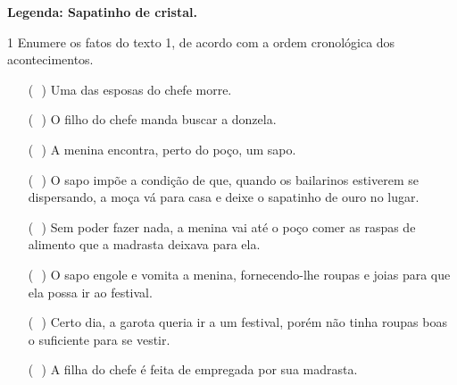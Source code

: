 \textbf{Legenda: Sapatinho de cristal.}


\num{1} Enumere os fatos do texto 1, de acordo com a ordem cronológica
dos acontecimentos.

\begin{itemize}
\item[(\,\,\,\,)] Uma das esposas do chefe morre.
\item[(\,\,\,\,)] O filho do chefe manda buscar a donzela.
\item[(\,\,\,\,)] A menina encontra, perto do poço, um sapo.
\item[(\,\,\,\,)] O sapo impõe a condição de que, quando os bailarinos estiverem se
dispersando, a moça vá para casa e deixe o sapatinho de ouro no lugar.
\item[(\,\,\,\,)] Sem poder fazer nada, a menina vai até o poço comer as raspas de
alimento que a madrasta deixava para ela.
\item[(\,\,\,\,)] O sapo engole e vomita a menina, fornecendo-lhe roupas e joias para
que ela possa ir ao festival.
\item[(\,\,\,\,)] Certo dia, a garota queria ir a um festival, porém não tinha roupas
boas o suficiente para se vestir.
\item[(\,\,\,\,)] A filha do chefe é feita de empregada por sua madrasta.
\end{itemize}


